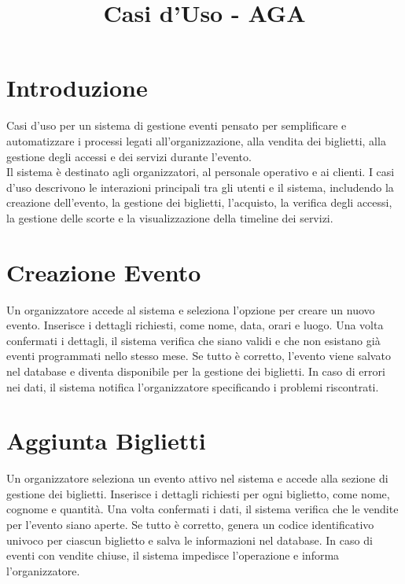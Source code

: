 \documentclass[a4paper,12pt]{article}
\title{\textcolor{titlecolor}{\Huge Casi d'Uso - AGA \\ \text{Formato Breve}}}
\author{}
\date{}
\begin{document}
\maketitle

\section*{\textcolor{sectioncolor}{Introduzione}}
\textcolor{textcolor}{

Casi d’uso per un sistema di gestione eventi pensato per semplificare e automatizzare i processi legati all'organizzazione, alla vendita dei biglietti, alla gestione degli accessi e dei servizi durante l'evento. \\ Il sistema è destinato agli organizzatori, al personale operativo e ai clienti.
I casi d'uso descrivono le interazioni principali tra gli utenti e il sistema, includendo la creazione dell'evento, la gestione dei biglietti, l'acquisto, la verifica degli accessi, la gestione delle scorte e la visualizzazione della timeline dei servizi.

}

\section{\textcolor{sectioncolor}{Creazione Evento}}
\textcolor{textcolor}{
Un organizzatore accede al sistema e seleziona l'opzione per creare un nuovo evento. Inserisce i dettagli richiesti, come nome, data, orari e luogo. Una volta confermati i dettagli, il sistema verifica che siano validi e che non esistano già eventi programmati nello stesso mese. Se tutto è corretto, l’evento viene salvato nel database e diventa disponibile per la gestione dei biglietti. In caso di errori nei dati, il sistema notifica l’organizzatore specificando i problemi riscontrati.
}

\section{\textcolor{sectioncolor}{Aggiunta Biglietti}}
\textcolor{textcolor}{
Un organizzatore seleziona un evento attivo nel sistema e accede alla sezione di gestione dei biglietti. Inserisce i dettagli richiesti per ogni biglietto, come nome, cognome e quantità. Una volta confermati i dati, il sistema verifica che le vendite per l’evento siano aperte. Se tutto è corretto, genera un codice identificativo univoco per ciascun biglietto e salva le informazioni nel database. In caso di eventi con vendite chiuse, il sistema impedisce l’operazione e informa l’organizzatore.
}
\end{document}
